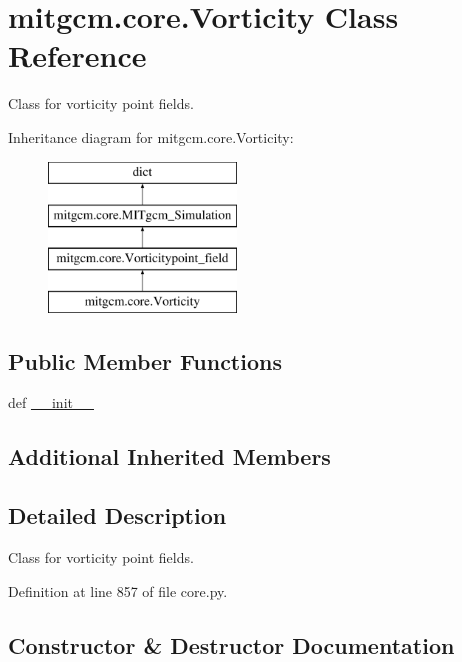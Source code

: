 \hypertarget{classmitgcm_1_1core_1_1Vorticity}{}\section{mitgcm.\+core.\+Vorticity Class Reference}
\label{classmitgcm_1_1core_1_1Vorticity}


Class for vorticity point fields.  


Inheritance diagram for mitgcm.\+core.\+Vorticity\+:\begin{figure}[H]
\begin{center}
\leavevmode
\includegraphics[height=4.000000cm]{classmitgcm_1_1core_1_1Vorticity}
\end{center}
\end{figure}
\subsection*{Public Member Functions}
\begin{DoxyCompactItemize}
\item 
def \hyperlink{classmitgcm_1_1core_1_1Vorticity_a43bff58c89253c8425aef49b7ab37e2d}{\+\_\+\+\_\+init\+\_\+\+\_\+}
\end{DoxyCompactItemize}
\subsection*{Additional Inherited Members}


\subsection{Detailed Description}
Class for vorticity point fields. 



Definition at line 857 of file core.\+py.



\subsection{Constructor \& Destructor Documentation}
\hypertarget{classmitgcm_1_1core_1_1Vorticity_a43bff58c89253c8425aef49b7ab37e2d}{}
